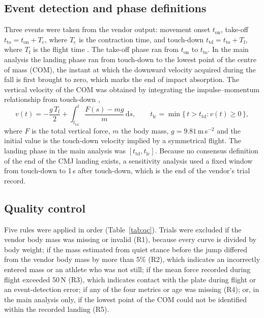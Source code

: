 \subsection{Event detection and phase definitions}
\label{sec:events}

Three events were taken from the vendor output: movement onset $t_{\mathrm{on}}$, take-off $t_{\mathrm{to}} = t_{\mathrm{on}} + T_{\mathrm{c}}$, where $T_{\mathrm{c}}$ is the contraction time, and touch-down $t_{\mathrm{td}} = t_{\mathrm{to}} + T_{\mathrm{f}}$, where $T_{\mathrm{f}}$ is the flight time \citep{owen2014,mcmahon2018,harry2020}. The take-off phase ran from $t_{\mathrm{on}}$ to $t_{\mathrm{to}}$. In the main analysis the landing phase ran from touch-down to the lowest point of the centre of mass (COM), the instant at which the downward velocity acquired during the fall is first brought to zero, which marks the end of impact absorption. The vertical velocity of the COM was obtained by integrating the impulse--momentum relationship from touch-down \citep{linthorne2001,street2001},
\begin{equation}
v(t) = -\frac{g\,T_{\mathrm{f}}}{2} + \int_{t_{\mathrm{td}}}^{t} \frac{F(s) - m g}{m}\,\mathrm{d}s,
\qquad
t_{\mathrm{lc}} = \min\{\, t > t_{\mathrm{td}} : v(t) \ge 0 \,\},
\label{eq:velocity}
\end{equation}
where $F$ is the total vertical force, $m$ the body mass, $g = 9.81$\,m\,s$^{-2}$ and the initial value is the touch-down velocity implied by a symmetrical flight. The landing phase in the main analysis was $[t_{\mathrm{td}}, t_{\mathrm{lc}}]$. Because no consensus definition of the end of the CMJ landing exists, a sensitivity analysis used a fixed window from touch-down to 1\,s after touch-down, which is the end of the vendor's trial record.

\subsection{Quality control}

Five rules were applied in order (Table~\ref{tab:qc}). Trials were excluded if the vendor body mass was missing or invalid (R1), because every curve is divided by body weight; if the mass estimated from quiet stance before the jump differed from the vendor body mass by more than 5\% (R2), which indicates an incorrectly entered mass or an athlete who was not still; if the mean force recorded during flight exceeded 50\,N (R3), which indicates contact with the plate during flight or an event-detection error; if any of the four metrics or age was missing (R4); or, in the main analysis only, if the lowest point of the COM could not be identified within the recorded landing (R5).

